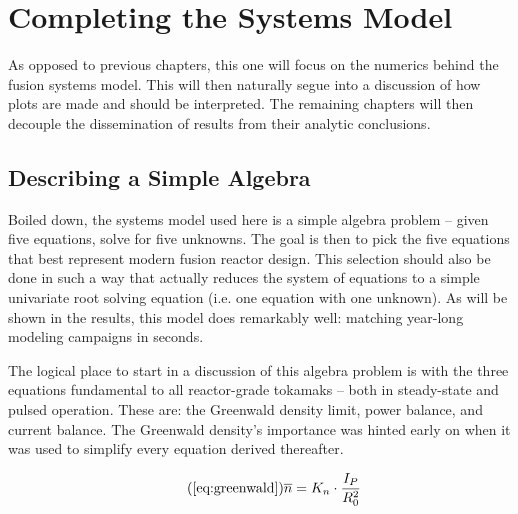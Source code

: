 %
%
%
%
%
%
%
%

\chapter{Completing the Systems Model}

As opposed to previous chapters, this one will focus on the numerics behind the fusion systems model. This will then naturally segue into a discussion of how plots are made and should be interpreted. The remaining chapters will then decouple the dissemination of results from their analytic conclusions.

\section{Describing a Simple Algebra}

Boiled down, the systems model used here is a simple algebra problem -- given five equations, solve for five unknowns. The goal is then to pick the five equations that best represent modern fusion reactor design. This selection should also be done in such a way that actually reduces the system of equations to a simple univariate root solving equation (i.e. one equation with one unknown). As will be shown in the results, this model does remarkably well: matching year-long modeling campaigns in seconds.

The logical place to start in a discussion of this algebra problem is with the three equations fundamental to all reactor-grade tokamaks -- both in steady-state and pulsed operation. These are: the Greenwald density limit, power balance, and current balance. The Greenwald density's importance was hinted early on when it was used to simplify every equation derived thereafter. 

\begin{equation}
	\tag{\ref{eq:greenwald}}
	\overline n = K_n \cdot \frac{I_P}{R_0^2}
\end{equation}

